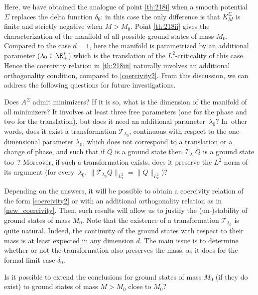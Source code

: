 Here, we have obtained the analogue of point \eqref{th:218i} when a smooth potential $\Sigma$ replaces the delta function $\delta_{0}$: in this case the only difference is that $K_{M}^{\Sigma}$ is finite and strictly negative when $M>M_{0}$. Point \eqref{th:218ii} gives the characterization of the manifold of all possible ground states of mass $M_{0}$. Compared to the case $d=1$, here the manifold is parametrized by an additional parameter ($\lambda_{0}\in\R_{+}^{*}$) which is the translation of the $L^{2}$-criticality of this case. Hence the coercivity relation in \eqref{th:218iii} naturally involves an additional orthogonality condition, compared to \eqref{coercivity2}. From this discussion, we can address the following questions for future investigations.

\begin{question}
Does $A^{\Sigma}$ admit minimizers? If it is so, what is the dimension of the manifold of all minimizers? It involves at least three free parameters (one for the phase and two for the translation), but does it need an additional parameter~$\lambda_{0}$? In~other words, does it exist a transformation $\mathcal{T}_{\lambda_{0}}$, continuous with respect to the one-dimensional parameter $\lambda_{0}$, which does not correspond to a translation or a change of phase, and such that if $Q$ is a ground state then $\mathcal{T}_{\lambda_{0}}Q$ is a ground state too~? Moreover, if such a transformation exists, does it preserve the $L^{2}$-norm of its argument (for every~$\lambda_{0}$, $\|\mathcal{T}_{\lambda_{0}}Q\|_{L_{x}^{2}}=\|Q\|_{L_{x}^{2}}$)?
\end{question}

Depending on the answers, it will be possible to obtain a coercivity relation of the form \eqref{coercivity2} or with an additional orthogonality relation as in \eqref{new_coercivity}. Then, such results will allow us to justify the (un-)stability of ground states of mass $M_{0}$. Note that the existence of a transformation $\mathcal{T}_{\lambda_{0}}$ is quite natural. Indeed, the continuity of the ground states with respect to their mass is at least expected in any dimension $d$. The main issue is to determine whether
or not the transformation also preserves the mass, as
it does for the formal limit case $\delta_{0}$.

\begin{question}
Is it possible to extend the conclusions for ground states of mass $M_{0}$ (if they do exist) to ground states of mass $M>M_{0}$ close to $M_{0}$?
\end{question}

